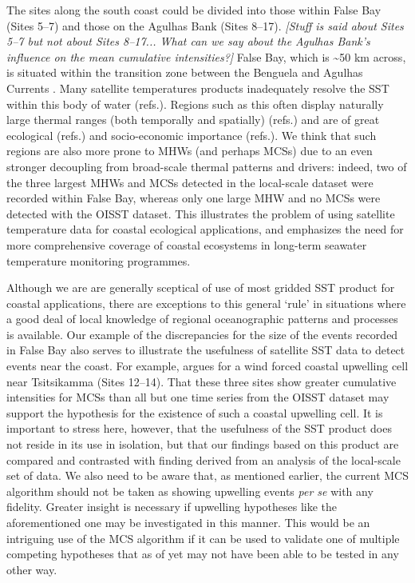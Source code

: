 \documentclass[a4paper,10pt,review]{elsarticle}
\begin{document}
The sites along the south coast could be divided into those within False Bay (Sites 5--7) and those on the Agulhas Bank (Sites 8--17). \emph{[Stuff is said about Sites 5--7 but not about Sites 8--17... What can we say about the Agulhas Bank's influence on the mean cumulative intensities?]} False Bay, which is \textasciitilde50 km across, is situated within the transition zone between the Benguela and Agulhas Currents \citep{Smit2013}. Many satellite temperatures products inadequately resolve the SST within this body of water (refs.). Regions such as this often display naturally large thermal ranges (both temporally and spatially) (refs.) and are of great ecological (refs.) and socio-economic importance (refs.). We think that such regions are also more prone to MHWs (and perhaps MCSs) due to an even stronger decoupling from broad-scale thermal patterns and drivers: indeed, two of the three largest MHWs and MCSs detected in the local-scale dataset were recorded within False Bay, whereas only one large MHW and no MCSs were detected with the OISST dataset. This illustrates the problem of using satellite temperature data for coastal ecological applications, and emphasizes the need for more comprehensive coverage of coastal ecosystems in long-term seawater temperature monitoring programmes.

Although we are are generally sceptical of use of most gridded SST product for coastal applications, there are exceptions to this general `rule' in situations where a good deal of local knowledge of regional oceanographic patterns and processes is available. Our example of the discrepancies for the size of the events recorded in False Bay also serves to illustrate the usefulness of satellite SST data to detect events near the coast. For example, \citet{Roberts2005} argues for a wind forced coastal upwelling cell near Tsitsikamma (Sites 12--14). That these three sites show greater cumulative intensities for MCSs than all but one time series from the OISST dataset may support the hypothesis for the existence of such a coastal upwelling cell. It is important to stress here, however, that the usefulness of the SST product does not reside in its use in isolation, but that our findings based on this product are compared and contrasted with finding derived from an analysis of the local-scale set of data. We also need to be aware that, as mentioned earlier, the current MCS algorithm should not be taken as showing upwelling events \emph{per se} with any fidelity. Greater insight is necessary if upwelling hypotheses like the aforementioned one may be investigated in this manner. This would be an intriguing use of the MCS algorithm if it can be used to validate one of multiple competing hypotheses that as of yet may not have been able to be tested in any other way.
\end{document}
